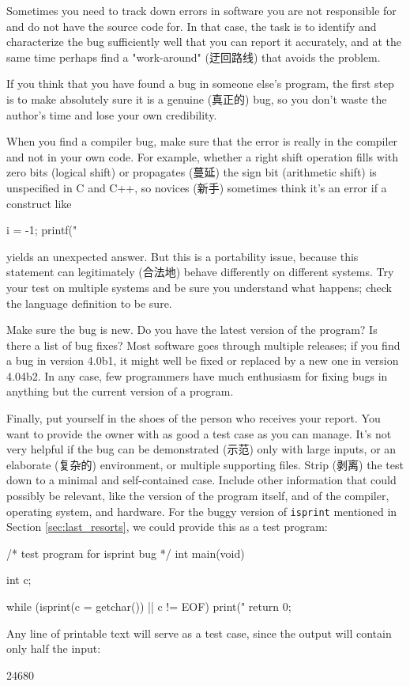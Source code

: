 Sometimes you need to track down errors in software you are not responsible
for and do not have the source code for. In that case, the task is to
identify and characterize the bug sufficiently well that you can report it
accurately, and at the same time perhaps find a "work-around" (迂回路线)
that avoids the problem.

If you think that you have found a bug in someone else's program, the first
step is to make absolutely sure it is a genuine (真正的) bug, so you don't
waste the author's time and lose your own credibility.

When you find a compiler bug, make sure that the error is really in the
compiler and not in your own code. For example, whether a right shift
operation fills with zero bits (logical shift) or propagates (蔓延) the
sign bit (arithmetic shift) is unspecified in C and C++, so novices (新手)
sometimes think it's an error if a construct like
\begin{badcode}
    i = -1;
    printf("%
\end{badcode}
yields an unexpected answer. But this is a portability issue, because this
statement can legitimately (合法地) behave differently on different
systems. Try your test on multiple systems and be sure you understand what
happens; check the language definition to be sure.

Make sure the bug is new. Do you have the latest version of the program? Is
there a list of bug fixes? Most software goes through multiple releases;
if you find a bug in version 4.0b1, it might well be fixed or replaced by a
new one in version 4.04b2. In any case, few programmers have much
enthusiasm for fixing bugs in anything but the current version of a
program.

Finally, put yourself in the shoes of the person who receives your report.
You want to provide the owner with as good a test case as you can manage.
It's not very helpful if the bug can be demonstrated (示范) only with large
inputs, or an elaborate (复杂的) environment, or multiple supporting files.
Strip (剥离)
the test down to a minimal and self-contained case. Include other
information that could possibly be relevant, like the version of the
program itself, and of the compiler, operating system, and hardware.  For
the buggy version of \verb'isprint' mentioned in Section
\ref{sec:last_resorts}, we could provide this as a test program:
\begin{wellcode}
    /* test program for isprint bug */
    int main(void)
    {
        int c;

        while (isprint(c = getchar()) || c != EOF)
            print("%
        return 0;
    }
\end{wellcode}
Any line of printable text will serve as a test case, since the output will
contain only half the input:
\begin{wellcode}
    24680
\end{wellcode}

